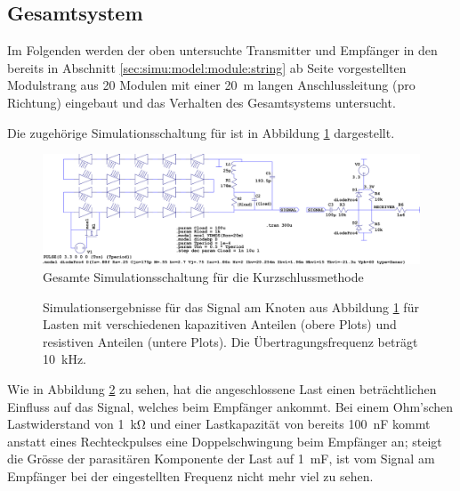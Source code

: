 \clearpage
\subsection{Gesamtsystem}
\label{subsec:simu:ask:total}


Im  Folgenden   werden  der  oben  untersuchte   Transmitter  und  Empf\"anger
in  den  bereits  in  Abschnitt  \ref{sec:simu:model:module:string}  ab  Seite
\pageref{sec:simu:model:module:string}   vorgestellten   Modulstrang  aus   20
Modulen  mit  einer  \SI{20}{\meter} langen  Anschlussleitung  (pro  Richtung)
eingebaut und das Verhalten des Gesamtsystems untersucht.

Die zugeh\"orige  Simulationsschaltung f\"ur   ist  in Abbildung
\ref{fig:ltspice:shortcircuit:complete} dargestellt.

\begin{figure}[h!tb]
    \includegraphics[width=\textwidth]{images/ltspice/jac/shortcircuit.png}
    \caption{Gesamte Simulationsschaltung f\"ur die Kurzschlussmethode}
    \label{fig:ltspice:shortcircuit:complete}
\end{figure}

\begin{figure}[h!tb]
    \centering
    
    \caption{%
        Simulationsergebnisse  f\"ur  das  Signal  am  Knoten  
        aus  Abbildung  \ref{fig:ltspice:shortcircuit:complete}  f\"ur  Lasten
        mit   verschiedenen    kapazitiven   Anteilen       (obere
        Plots)  und  resistiven   Anteilen    (untere  Plots). Die
        \"Ubertragungsfrequenz betr\"agt \SI{10}{\kilo\hertz}.%
    }
    \label{fig:simu:short:complete}
\end{figure}

Wie   in   Abbildung   \ref{fig:simu:short:complete}   zu   sehen,   hat   die
angeschlossene   Last  einen   betr\"achtlichen  Einfluss   auf  das   Signal,
welches  beim  Empf\"anger  ankommt. Bei einem  Ohm'schen  Lastwiderstand  von
\SI{1}{\kilo\ohm} und einer  Lastkapazit\"at von bereits \SI{100}{\nano\farad}
kommt  anstatt eines  Rechteckpulses  eine  Doppelschwingung beim  Empf\"anger
an;  steigt   die  Gr\"osse   der  parasit\"aren   Komponente  der   Last  auf
\SI{1}{\milli\farad},  ist vom  Signal  am Empf\"anger  bei der  eingestellten
Frequenz nicht mehr viel zu sehen.

